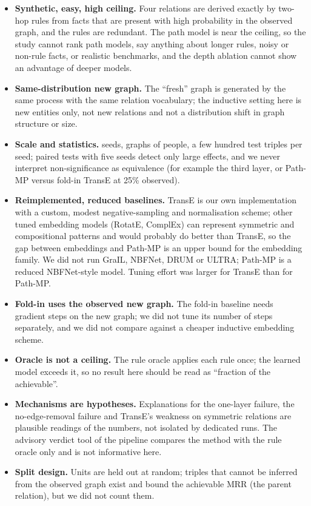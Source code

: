 \begin{itemize}
\item \textbf{Synthetic, easy, high ceiling.} Four relations are derived exactly by two-hop rules from facts that are present with high probability in the observed graph, and the rules are redundant. The path model is near the ceiling, so the study cannot rank path models, say anything about longer rules, noisy or non-rule facts, or realistic benchmarks, and the depth ablation cannot show an advantage of deeper models.
\item \textbf{Same-distribution new graph.} The ``fresh'' graph is generated by the same process with the same relation vocabulary; the inductive setting here is new entities only, not new relations and not a distribution shift in graph structure or size.
\item \textbf{Scale and statistics.}  seeds, graphs of  people, a few hundred test triples per seed; paired tests with five seeds detect only large effects, and we never interpret non-significance as equivalence (for example the third layer, or Path-MP versus fold-in TransE at 25\% observed).
\item \textbf{Reimplemented, reduced baselines.} TransE is our own implementation with a custom, modest negative-sampling and normalisation scheme; other tuned embedding models (RotatE, ComplEx) can represent symmetric and compositional patterns and would probably do better than TransE, so the gap between embeddings and Path-MP is an upper bound for the embedding family. We did not run GraIL, NBFNet, DRUM or ULTRA; Path-MP is a reduced NBFNet-style model. Tuning effort was larger for TransE than for Path-MP.
\item \textbf{Fold-in uses the observed new graph.} The fold-in baseline needs gradient steps on the new graph; we did not tune its number of steps separately, and we did not compare against a cheaper inductive embedding scheme.
\item \textbf{Oracle is not a ceiling.} The rule oracle applies each rule once; the learned model exceeds it, so no result here should be read as ``fraction of the achievable''.
\item \textbf{Mechanisms are hypotheses.} Explanations for the one-layer failure, the no-edge-removal failure and TransE's weakness on symmetric relations are plausible readings of the numbers, not isolated by dedicated runs. The advisory verdict tool of the pipeline compares the method with the rule oracle only and is not informative here.
\item \textbf{Split design.} Units are held out at random; triples that cannot be inferred from the observed graph exist and bound the achievable MRR (the parent relation), but we did not count them.
\end{itemize}
